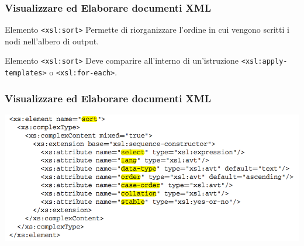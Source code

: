 
\begin{frame}
    \frametitle{Visualizzare ed Elaborare documenti XML}
    \addtocounter{nframe}{1}
    

     \begin{block}{Elemento \texttt{<xsl:sort>}}
        Permette di riorganizzare l’ordine in cui vengono scritti i nodi nell’albero di output.
     \end{block}

     \begin{block}{Elemento \texttt{<xsl:sort>}}
        Deve comparire all’interno di un’istruzione \texttt{<xsl:apply-templates>} o \texttt{<xsl:for-each>}.
     \end{block}

\end{frame}

\begin{frame}
    \frametitle{Visualizzare ed Elaborare documenti XML}
    \addtocounter{nframe}{1}
    
    \begin{center}
        \includegraphics[width=.9\textwidth]{imgs/Schema-sort.png}
    \end{center}

\end{frame}


